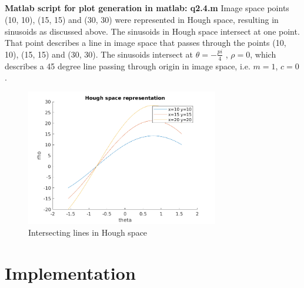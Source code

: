 \documentclass[12pt]{article}
\begin{document}
\newpage
\subsection{}
\textbf{Matlab script for plot generation in matlab: q2.4.m}
Image space points (10, 10), (15, 15) and (30, 30) were represented in Hough space, resulting in sinusoids as discussed above. The sinusoids in Hough space intersect at one point. That point describes a line in image space that passes through the points (10, 10), (15, 15) and (30, 30). The sinusoids intersect at $\theta = - \frac{pi}{4}$ , $\rho = 0$, which describes a 45 degree line passing through origin in image space, i.e. $m=1$, $c=0$.



\begin{figure}[H]
\centering
\includegraphics[page=1,width=0.75\textwidth]{q2_4}
\caption{Intersecting lines in Hough space}    
\label{fig:bblr}
\end{figure}   

\newpage
\section{Implementation}
\subsection{}
\newpage
\subsection{}
\newpage
\subsection{}
\newpage
\subsection{}
\newpage
\end{document}
